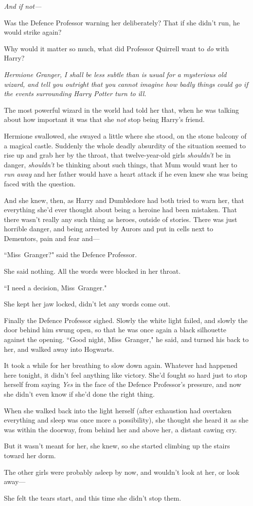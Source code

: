 \emph{And if not—}

Was the Defence Professor warning her deliberately? That if she didn't run, he would strike again?

Why would it matter so much, what did Professor Quirrell want to \emph{do} with Harry?

\emph{Hermione Granger, I shall be less subtle than is usual for a mysterious old wizard, and tell you outright that you cannot \emph{imagine} how badly things could go if the events surrounding Harry Potter turn to ill.}

The most powerful wizard in the world had told her that, when he was talking about how important it was that she \emph{not} stop being Harry's friend.

Hermione swallowed, she swayed a little where she stood, on the stone balcony of a magical castle. Suddenly the whole deadly absurdity of the situation seemed to rise up and grab her by the throat, that twelve-year-old girls \emph{shouldn't} be in danger, \emph{shouldn't} be thinking about such things, that Mum would want her to \emph{run away} and her father would have a heart attack if he even knew she was being faced with the question.

And she knew, then, as Harry and Dumbledore had both tried to warn her, that everything she'd ever thought about being a heroine had been mistaken. That there wasn't really any such thing as heroes, outside of stories. There was just horrible danger, and being arrested by Aurors and put in cells next to Dementors, pain and fear and—

``Miss~Granger?" said the Defence Professor.

She said nothing. All the words were blocked in her throat.

``I need a decision, Miss~Granger."

She kept her jaw locked, didn't let any words come out.

Finally the Defence Professor sighed. Slowly the white light failed, and slowly the door behind him swung open, so that he was once again a black silhouette against the opening. ``Good night, Miss~Granger," he said, and turned his back to her, and walked away into Hogwarts.

It took a while for her breathing to slow down again. Whatever had happened here tonight, it didn't feel anything like victory. She'd fought so hard just to stop herself from saying \emph{Yes} in the face of the Defence Professor's pressure, and now she didn't even know if she'd done the right thing.

When she walked back into the light herself (after exhaustion had overtaken everything and sleep was once more a possibility), she thought she heard it as she was within the doorway, from behind her and above her, a distant cawing cry.

But it wasn't meant for her, she knew, so she started climbing up the stairs toward her dorm.

The other girls were probably asleep by now, and wouldn't look at her, or look away—

She felt the tears start, and this time she didn't stop them.

